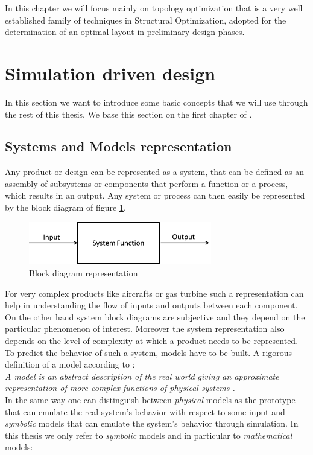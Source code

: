 In this chapter we will focus mainly on topology optimization that is a very well established family of techniques in Structural Optimization, adopted for the determination of an optimal layout in preliminary design phases.
\section{Simulation driven design}
\label{sec:2.1}
In this section we want to introduce some basic concepts that we will use through the rest of this thesis. We base this section on the first chapter of \cite{papalambros2000principles}.
\subsection{Systems and Models representation}
Any product or design can be represented as a system, that can be defined as an assembly of subsystems or components that perform a function or a process, which results in an output. Any system or process can then easily be represented by the block diagram of figure \ref{fig.2.1}.
\begin{figure}[ht]
\centering
\includegraphics[width=8cm]{images/Ch2/Block_diagram_rep}
\caption{Block diagram representation}
\label{fig.2.1}
\end{figure}
For very complex products like aircrafts or gas turbine such a representation can help in understanding the flow of inputs and outputs between each component. On the other hand system block diagrams are subjective and they depend on the particular phenomenon of interest. Moreover the system representation also depends on the level of complexity at which a product needs to be represented. To predict the behavior of such a system, models have to be built. A rigorous definition of a model according to \cite{papalambros2000principles}:\\
\textit{A model is an abstract description of the real world giving an approximate representation of more complex functions of physical systems .}\\
In the same way one can distinguish between \textit{physical} models as the prototype that can emulate the real system's behavior with respect to some input and \textit{symbolic} models that can emulate the system's behavior through simulation. In this thesis we only refer to \textit{symbolic} models and in particular to \textit{mathematical} models:\\
